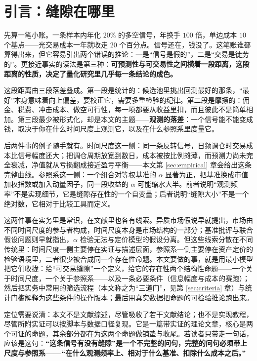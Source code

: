 \section{引言：缝隙在哪里}\label{sec:intro}

先算一笔小账。一条样本内年化 $20\%$ 的多空信号，年换手 $100$ 倍，单边成本 $10$ 个基点——光交易成本一年就收走 $20$ 个百分点。信号还在，钱没了。这笔账谁都算得出来，但它容易引出两个错误的推论：一是“信号是假的”，二是“交易是徒劳的”。更接近事实的读法是第三种：\textbf{可预测性与可交易性之间横着一段距离，这段距离的性质，决定了量化研究里几乎每一条结论的成色。}

这段距离由三段落差叠成。第一段是统计的：候选池里挑出回测最好的那条，“最好”本身意味着向上偏差，要校正它，需要多重检验的纪律\cite{white2000,harveylz2016}。第二段是摩擦的：佣金、税费、冲击成本、做空可行性，每一项都要从收益里扣，而且彼此不是简单相加。第三段最少被形式化，却是本文的主题——\textbf{观测的落差}：一个信号能不能变成钱，取决于你在什么时间尺度上观测它，以及在什么参照系里度量它。

后两件事的例子随手就有。时间尺度这一侧：同一条反转信号，日频调仓时交易成本比信号幅度还大；把调仓周期放宽到数日，成本被按比例摊薄，而预测力尚未完全衰减，净值就从亏损翻成接近盈亏平衡——本文第 \ref{sec:empirical} 章会给出这条完整曲线。参照系这一侧：一个组合对等权基准的 $\alpha$ 显著为正，把基准换成市值加权指数或加入动量因子，同一段收益的 $\alpha$ 可能缩水大半。前者说明“观测频率”不是实现细节，它是缝隙存在性的一个自变量；后者说明“缝隙大小”不是一个绝对数，它相对于比较工具而定义。

这两件事在实务里是常识，在文献里也各有线索。异质市场假说早就提出，市场由不同时间尺度的参与者构成，时间尺度本身是市场结构的一部分\cite{muller1993}；基准批评\cite{roll1977}与联合假设问题\cite{fama1970}则早就指出，$\alpha$ 检验无法与定价模型的假设分离。但这些线索分散在不同传统里：时间尺度一侧主要停在实证与描述层面，参照系一侧主要停在资产定价的检验语境里，二者很少被合成同一个存在性命题。本文要做的事，就是用最小模型把它们收拢：给“可交易缝隙”一个定义，给它的存在性两个结构性命题——一个关于时间尺度，一个关于参照系——以及一条必要条件（信息幅度与成本的赛跑）；然后把实务中常用的筛选流程（本文称之为“三道门”，见第 \ref{sec:criteria} 章）与统计门槛解释为这些条件的操作版本；最后用真实数据把命题的可检验推论跑出来。

定位需要说清：本文不是文献综述，尽管吸收了若干文献结论；也不是实现教程，尽管所附实证可以按脚本与数据口径复现。它是一篇带实证的理论文章，核心是两个可证的命题，其余部分都在为这两个命题做铺垫与收尾。若读者只带走一句话，应该是这句：\textbf{“这条信号有没有缝隙”是一个不完整的问句，完整的问句必须带上尺度与参照系——“在什么观测频率上、相对于什么基准、扣除什么成本之后。”}

